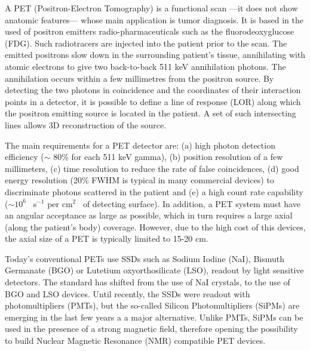 \documentclass[a4paper,11pt,oneside]{article}
\begin{document}
A PET (Positron-Electron Tomography) is a functional scan ---it does not show anatomic features--- whose main application is tumor diagnosis. It is based in the used of positron emitters radio-pharmaceuticals such as the fluorodeoxyglucose (FDG). Such radiotracers 
are injected into the patient prior to the scan. The emitted positrons slow down in the surrounding patient’s tissue, annihilating with atomic electrons to give two back-to-back 511 keV annihilation photons. The annihilation occurs within a few millimetres from the positron source. By detecting the two photons in coincidence and the coordinates of their interaction points in a detector, it is possible to define a line of response (LOR) along which the positron emitting source is located in the patient. A set of such intersecting lines allows 3D reconstruction of the source. 

The main requirements for a PET detector are: (a) high photon detection efficiency ($\sim$ 80\% for each 511 keV gamma), (b) position resolution of a few millimeters, (c) time resolution to reduce the rate of false coincidences, (d) good energy resolution (20\% FWHM is typical in many commercial devices) to discriminate photons scattered in the patient and (e) a high count rate capability ($\sim10^6$~ s$^{-1}$ per cm$^2$~ of detecting surface). In addition, a PET system must have an angular acceptance as large as possible, which in turn requires a large axial (along the patient's body) coverage. However, due to the high cost of this devices, the axial size  of a PET is typically limited to 15-20 cm. 

Today's conventional PETs use SSDs such as Sodium Iodine (NaI), Bismuth Germanate (BGO) or Lutetium oxyorthosilicate (LSO), readout by light sensitive detectors. The standard has shifted from the use of NaI crystals, to the use of BGO and LSO devices. Until recently, the SSDs were readout with photomultipliers (PMTs), but the so-called Silicon Photomultipliers (SiPMs) are emerging in the last few years a a major alternative. Unlike PMTs, SiPMs can be used in the presence of a strong magnetic field, therefore opening the possibility to build Nuclear Magnetic Resonance (NMR) compatible PET devices. 
\end{document}
